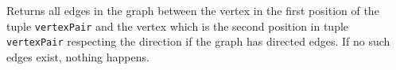 \begin{description}
  Returns all edges in the graph
  between the vertex in the first position of the tuple \texttt{vertexPair} and the vertex which is the second position in tuple \texttt{vertexPair} respecting
  the direction if the graph has directed edges.
  If no such edges exist, nothing happens.
  

  
\end{description}

